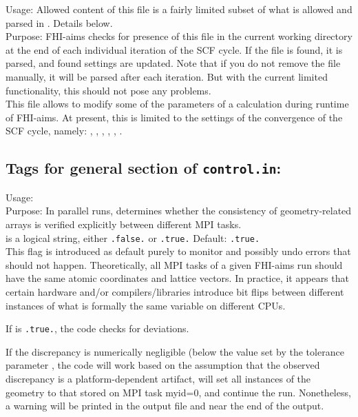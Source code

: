 {
  \noindent
  Usage: Allowed content of this file is a fairly limited subset of what is allowed and parsed in . Details below.\\[1.0ex] 
  Purpose: FHI-aims checks for presence of this file in the current working directory at the end of each individual iteration of the SCF cycle. If the file is found, it is parsed, and found settings are updated. Note that if you do not remove the file manually, it will be parsed after each iteration. But with the current limited functionality, this should not pose any problems.\\
}
This file allows to modify some of the parameters of a calculation during runtime of FHI-aims. At present, this is limited to the settings of the convergence of the SCF cycle, namely: , , , , , .

\newpage

\subsection*{Tags for general section of \texttt{control.in}:}

{
  \noindent
  Usage:   \\[1.0ex]
  Purpose: In parallel runs, determines whether the consistency of geometry-related
           arrays is verified explicitly between different MPI tasks. \\[1.0ex]
   is a logical string, either \texttt{.false.} or
    \texttt{.true.} Default: \texttt{.true.} \\
}
%
This flag is introduced as default purely to monitor and possibly undo errors
that should not happen. Theoretically, all MPI tasks of a given FHI-aims run
should have the same atomic coordinates and lattice vectors. In practice, it 
appears that certain hardware and/or compilers/libraries introduce bit flips
between different instances of what is formally the same variable on different
CPUs. 

If  is \texttt{.true.}, the code checks
for deviations. 

If the discrepancy is numerically negligible (below the
value set by the tolerance parameter , 
the code will work based on the assumption that the observed discrepancy is
a platform-dependent artifact, will set all instances of the geometry to
that stored on MPI task myid=0, and continue the run. Nonetheless, a warning
will be printed in the output file and near the end of the output.

